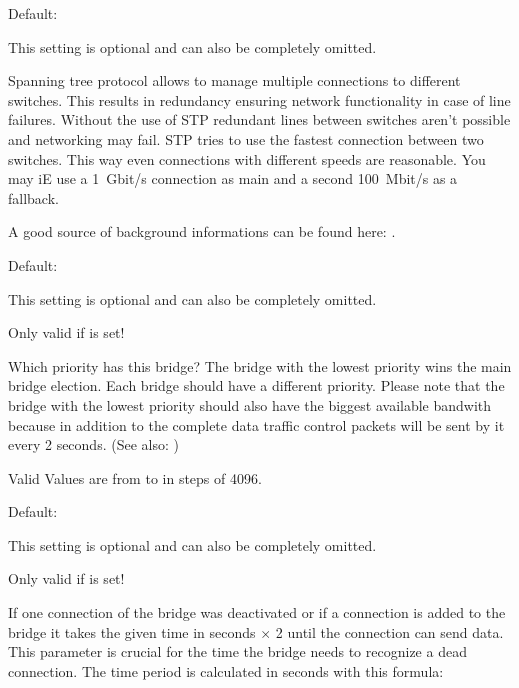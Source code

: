 \begin{description}

  Default: 

  This setting is optional and can also be completely omitted.

  Spanning tree protocol allows to manage multiple connections to 
  different switches. This results in redundancy ensuring network 
  functionality in case of line failures. Without the use of STP 
  redundant lines between switches aren't possible and networking 
  may fail. STP tries to use the fastest connection between two 
  switches. This way even connections with different speeds are 
  reasonable. You may iE use a 1~Gbit/s connection as main  
  and a second 100~Mbit/s as a fallback.

  A good source of background informations can be found here:
  \hfil\break
  .


  Default: 

  This setting is optional and can also be completely omitted.

  Only valid if  is set!

  Which priority has this bridge? The bridge with the lowest 
  priority wins the main bridge election. Each bridge should have 
  a different priority. Please note that the bridge with the lowest 
  priority should also have the biggest available bandwith because in 
  addition to the complete data traffic control packets will be sent 
  by it every 2 seconds. (See also: )
  
  Valid Values are from  to  in steps of 4096.


  Default: 

  This setting is optional and can also be completely omitted.

  Only valid if  is set!

  If one connection of the bridge was deactivated or if a connection 
  is added to the bridge it takes the given time in seconds $\times$ 2 
  until the connection can send data. This parameter is crucial for the 
  time the bridge needs to recognize a dead connection. The time period 
  is calculated in seconds with this formula:
  

\end{description}
